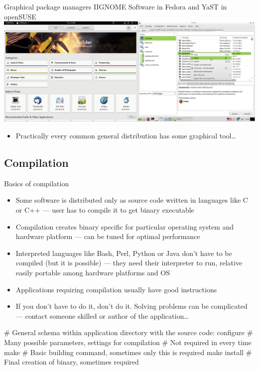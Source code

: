 \documentclass[compress, ucs, xelatex, 11pt, xcolor=svgnames,
  hyperref={
    bookmarks=true,
    unicode=true,
    colorlinks=true,
    pdftitle={Linux, command line and MetaCentrum},
    plainpages=false,
    pdfauthor={Vojtech Zeisek},
    pdfsubject={Course about use of Linux command line, writing shell scripts and using MetaCentrum of CESNET},
    pdfcreator={XeLaTeX},
    pdfkeywords={Linux, GNU, BASH, shell, command line, MetaCentrum},
    linkcolor=DarkRed,
    anchorcolor=DarkBlue,
    citecolor=Indigo,
    filecolor=NavyBlue,
    menucolor=DarkMagenta,
    urlcolor=DarkBlue,
    pdftex},
  url={hyphens, lowtilde} %
  ]{beamer}
\begin{document}
\begin{frame}{Graphical package managers II}{GNOME Software in Fedora and YaST in openSUSE}
  \includegraphics[width=\textwidth]{software_managers_fedora_suse.png}
  \begin{itemize}
    \item Practically every common general distribution has some graphical tool\ldots
  \end{itemize}
\end{frame}


\subsection{Compilation}

\begin{frame}[fragile]{Basics of compilation}
  \begin{itemize}
    \item Some software is distributed only as source code written in languages like C or C++ --- user has to compile it to get binary executable
    \item Compilation creates binary specific for particular operating system and hardware platform --- can be tuned for optimal performance
    \item Interpreted languages like Bash, Perl, Python or Java don't have to be compiled (but it is possible) --- they need their interpreter to run, relative easily portable among hardware platforms and OS
    \item Applications requiring compilation usually have good instructions
    \item If you don't have to do it, don't do it. Solving problems can be complicated --- contact someone skilled or author of the application\ldots
  \end{itemize}
  \begin{bashcode}
    # General schema within application directory with the source code:
    configure # Many possible parameters, settings for compilation
              # Not required in every time
    make # Basic building command, sometimes only this is required
    make install # Final creation of binary, sometimes required
  \end{bashcode}
\end{frame}
\end{document}
